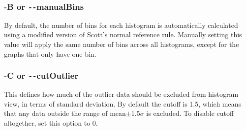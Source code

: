 \documentclass[letterpaper]{article}
\begin{document}
\subsubsection{\bf -B or \texttt{-{}-}manualBins}
By default, the number of bins for each histogram is automatically calculated using a modified version of Scott's normal reference rule. Manually setting this value will apply the same number of bins across all histograms, except for the graphs that only have one bin.
\subsubsection{\bf -C or \texttt{-{}-}cutOutlier}
This defines how much of the outlier data should be excluded from histogram view, in terms of standard deviation. By default the cutoff is 1.5, which means that any data outside the range of mean$\pm$1.5$\sigma$ is excluded. To disable cutoff altogether, set this option to 0.
\end{document}
